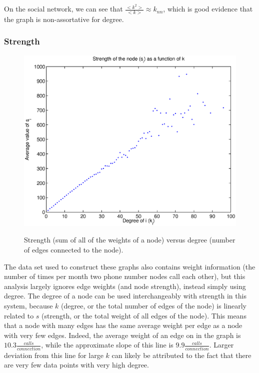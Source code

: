 \documentclass[12pt]{article}
\begin{document}
On the social network, we can see that \(\frac{<k^2>}{<k>} \approx k_{nn}\), which is good evidence that the graph is non-assortative for degree.

\subsubsection*{Strength}

\begin{figure}[H]
\includegraphics[trim = 0cm 0cm 0cm 0cm, width = .9\textwidth]{Graficos/svsk.eps}
\label{fig:svsk}
\caption{Strength (sum of all of the weights of a node) versus degree (number of edges connected to the node).}
\end{figure}

The data set used to construct these graphs also contains weight information (the number of times per month two phone number nodes call each other), but this analysis largely ignores edge weights (and node strength), instead simply using degree. The degree of a node can be used interchangeably with strength in this system, because \(k\) (degree, or the total number of edges of the node) is linearly related to \(s\) (strength, or the total weight of all edges of the node). This means that a node with many edges has the same average weight per edge as a node with very few edges. Indeed, the average weight of an edge on in the graph is \(10.3 \frac{calls}{connection}\), while the approximate slope of this line is \(9.9  \frac{calls}{connection}\). Larger deviation from this line for large \(k\) can likely be attributed to the fact that there are very few data points with very high degree.
\end{document}
